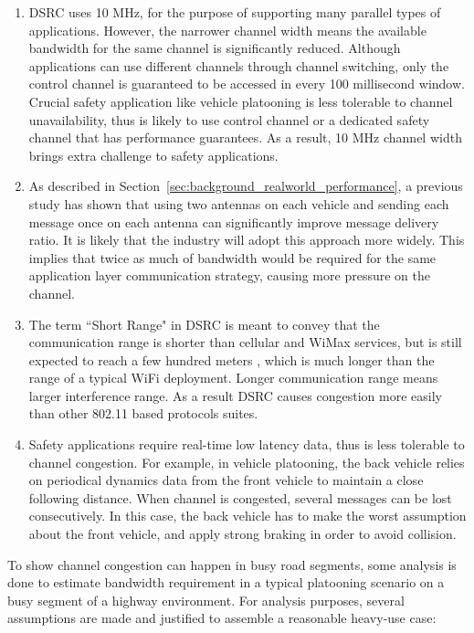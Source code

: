 \documentclass[12pt]{report}
\begin{document}
\begin{enumerate}
  \item DSRC uses 10 MHz, for the purpose of supporting many parallel types of applications. However, the narrower channel width means the available bandwidth for the same channel is significantly reduced. Although applications can use different channels through channel switching, only the control channel is guaranteed to be accessed in every 100 millisecond window. Crucial safety application like vehicle platooning is less tolerable to channel unavailability, thus is likely to use control channel or a dedicated safety channel that has performance guarantees. As a result, 10 MHz channel width brings extra challenge to safety applications.
  \item As described in Section~\ref{sec:background_realworld_performance}, a previous study \cite{songDSRC2016} has shown that using two antennas on each vehicle and sending each message once on each antenna can significantly improve message delivery ratio. It is likely that the industry will adopt this approach more widely. This implies that twice as much of bandwidth would be required for the same application layer communication strategy, causing more pressure on the channel.
  \item The term ``Short Range" in DSRC is meant to convey that the communication range is shorter than cellular and WiMax services, but is still expected to reach a few hundred meters \cite{kenney2011}, which is much longer than the range of a typical WiFi deployment. Longer communication range means larger interference range. As a result DSRC causes congestion more easily than other 802.11 based protocols suites.
  \item Safety applications require real-time low latency data, thus is less tolerable to channel congestion. For example, in vehicle platooning, the back vehicle relies on periodical dynamics data from the front vehicle to maintain a close following distance. When channel is congested, several messages can be lost consecutively. In this case, the back vehicle has to make the worst assumption about the front vehicle, and apply strong braking in order to avoid collision.
\end{enumerate}

To show channel congestion can happen in busy road segments, some analysis is done to estimate bandwidth requirement in a typical platooning scenario on a busy segment of a highway environment. For analysis purposes, several assumptions are made and justified to assemble a reasonable heavy-use case:
\end{document}
